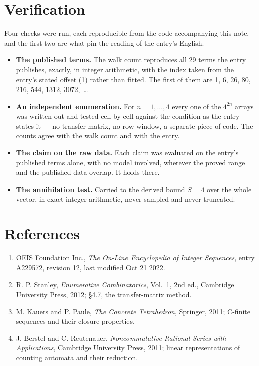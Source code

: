 \documentclass[11pt]{article}
\theoremstyle{definition}
\begin{document}
\section{Verification}

Four checks were run, each reproducible from the code accompanying this note, and the first two are what pin the reading of the entry's English.

\begin{itemize}

\item {\bfseries The published terms.} The walk count reproduces all 29 terms the entry publishes, exactly, in integer arithmetic, with the index taken from the entry's stated offset (1) rather than fitted. The first of them are 1, 6, 26, 80, 216, 544, 1312, 3072,~\dots

\item {\bfseries An independent enumeration.} For $n = 1,\dots,4$ every one of the $4^{2n}$ arrays was written out and tested cell by cell against the condition as the entry states it --- no transfer matrix, no row window, a separate piece of code. The counts agree with the walk count and with the entry.

\item {\bfseries The claim on the raw data.} Each claim was evaluated on the entry's published terms alone, with no model involved, wherever the proved range and the published data overlap. It holds there.

\item {\bfseries The annihilation test.} Carried to the derived bound $S = 4$ over the whole vector, in exact integer arithmetic, never sampled and never truncated.

\end{itemize}

\section{References}

\begin{enumerate}

\item OEIS Foundation Inc., \emph{The On-Line Encyclopedia of Integer Sequences}, entry \href{https://oeis.org/A229572}{A229572}, revision 12, last modified Oct 21 2022.

\item R. P. Stanley, \emph{Enumerative Combinatorics}, Vol.~1, 2nd ed., Cambridge University Press, 2012; \S4.7, the transfer-matrix method.

\item M. Kauers and P. Paule, \emph{The Concrete Tetrahedron}, Springer, 2011; C-finite sequences and their closure properties.

\item J. Berstel and C. Reutenauer, \emph{Noncommutative Rational Series with Applications}, Cambridge University Press, 2011; linear representations of counting automata and their reduction.

\end{enumerate}
\end{document}
